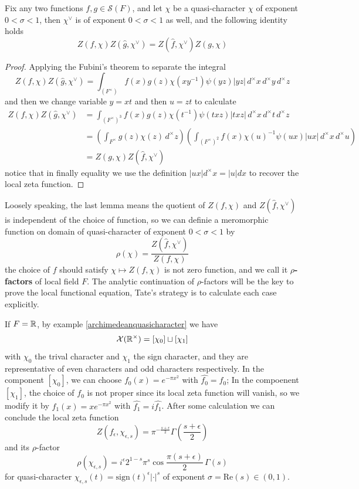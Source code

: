\begin{lemma} \label{tate}
    Fix any two functions \(f,g \in \mathcal{S}(F)\), and let \(\chi\) be a quasi-character \(\chi\) of exponent \(0< \sigma <1\), then \(\chi^\vee\) is of exponent \(0 < \sigma <1\) as well, and the following identity holds
    \[Z(f,\chi)Z(\hat{g},\chi^\vee) = Z(\hat{f},\chi^\vee)Z(g,\chi)\]
\end{lemma}

\begin{proof}
    Applying the Fubini's theorem to separate the integral 
    \[Z(f,\chi)Z(\hat{g},\chi^\vee) = \int_{(F^\times)}f(x)g(z)\chi(xy^{-1})\psi(yz)|yz| \, d^\times x \,d^\times y \, d^\times z\]
    and then we change variable \(y =xt\) and then \(u = zt\) to calculate
    \begin{align*}
        Z(f,\chi)Z(\hat{g},\chi^\vee) &= \int_{(F^\times)^3} f(x)g(z)\chi(t^{-1})\psi(txz)|txz| \, d^\times x \,d^\times t \, d^\times z \\
        &= (\int_{F^\times}g(z)\chi(z) \, d^\times z )(\int_{(F^\times)^2} f(x)\chi(u)^{-1}\psi(ux)|ux| \, d^\times x \,d^\times u) \\
        &= Z(g,\chi)Z(\hat{f},\chi^\vee)
    \end{align*}
    notice that in finally equality we use the definition \(|ux|d^\times x = |u|dx\) to recover the local zeta function.
\end{proof}

Loosely speaking, the last lemma means the quotient of \(Z(f,\chi)\) and \(Z(\hat{f},\chi^\vee)\) is independent of the choice of function, so we can definie a meromorphic function on domain of quasi-character of exponent \(0 < \sigma <1\) by
\[\rho(\chi) = \frac{Z(\hat{f},\chi^\vee)}{Z(f,\chi)}\]
the choice of \(f\) should satisfy \(\chi \mapsto Z(f,\chi) \) is not zero function, and we call it \textbf{\(\rho\)-factors} of local field \(F\). The analytic continuation of \(\rho\)-factors will be the key to prove the local functional equation, Tate's strategy is to calculate each case explicitly.

\begin{example}
    If \(F =\mathbb{R}\), by example \ref{archimedeanquasicharacter} we have
    \[\mathcal{X}(\mathbb{R}^\times) = [\chi_0] \sqcup [\chi_1]\]
    with \(\chi_0\) the trival character and \(\chi_1\) the sign character, and they are representative of even characters and odd characters respectively. In the component \([\chi_0]\), we can choose \(f_0(x) = e^{-\pi x^2}\) with \(\hat{f_0} = f_0\); In the compoenent \([\chi_1]\), the choice of \(f_0\) is not proper since its local zeta function will vanish, so we modify it by \(f_1(x) = x e^{-\pi x^2}\) with \(\hat{f_1} = i\hat{f_1}\). After some calculation we can conclude the local zeta function
    \[Z(f_{\epsilon},\chi_{\epsilon,s}) = \pi^{-\frac{s+\epsilon}{2}}\Gamma\!\left(\frac{s+\epsilon}{2}\right)\]
    and its \(\rho\)-factor
    \[\rho(\chi_{\epsilon,s}) = i^{\epsilon} 2^{1-s} \pi^s \cos\frac{\pi(s+\epsilon)}{2} \, \Gamma(s)\]
    for quasi-character \(\chi_{\epsilon,s}(t) = \mathrm{sign}(t)^{\epsilon}|\cdot|^s\) of exponent \(\sigma = \mathrm{Re}(s) \in (0,1)\).
\end{example}


